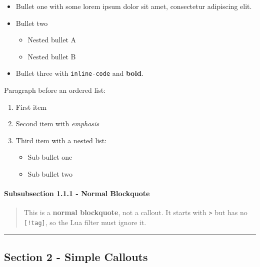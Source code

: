 \begin{itemize}
\tightlist
\item
  Bullet one with some lorem ipsum dolor sit amet, consectetur
  adipiscing elit.
\item
  Bullet two

  \begin{itemize}
  \tightlist
  \item
    Nested bullet A
  \item
    Nested bullet B
  \end{itemize}
\item
  Bullet three with \texttt{inline-code} and \textbf{bold}.
\end{itemize}

Paragraph before an ordered list:

\begin{enumerate}
\def\labelenumi{\arabic{enumi}.}
\tightlist
\item
  First item
\item
  Second item with \emph{emphasis}
\item
  Third item with a nested list:

  \begin{itemize}
  \tightlist
  \item
    Sub bullet one
  \item
    Sub bullet two
  \end{itemize}
\end{enumerate}

\paragraph{Subsubsection 1.1.1 - Normal
Blockquote}\label{inner-1-subsubsection-1.1.1---normal-blockquote}

\begin{quote}
This is a \textbf{normal blockquote}, not a callout. It starts with
\texttt{\textgreater{}} but has no \texttt{{[}!tag{]}}, so the Lua
filter must ignore it.
\end{quote}

\begin{center}\rule{0.5\linewidth}{0.5pt}\end{center}

\subsection{Section 2 - Simple
Callouts}\label{inner-1-section-2---simple-callouts}


